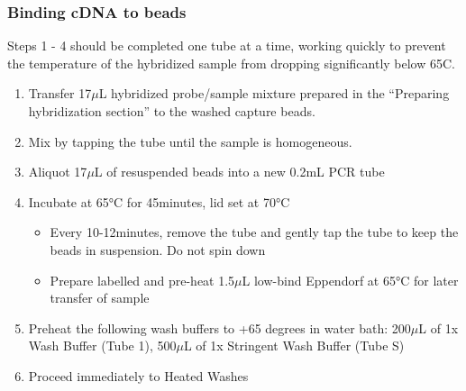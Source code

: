 \subsubsection{Binding cDNA to beads}
Steps 1 - 4 should be completed one tube at a time, working quickly to prevent the temperature of the hybridized sample from dropping significantly below 65C.
\begin{enumerate}
	\item Transfer 17$\mu$L hybridized probe/sample mixture prepared in the “Preparing hybridization section” to the washed capture beads.
	\item Mix by tapping the tube until the sample is homogeneous. 
	\item Aliquot 17$\mu$L of resuspended beads into a new 0.2mL PCR tube 
	\item Incubate at 65°C for 45minutes, lid set at 70°C
	\begin{itemize}
		\item Every 10-12minutes, remove the tube and gently tap the tube to keep the beads in suspension. Do not spin down 
		\item Prepare labelled and pre-heat 1.5$\mu$L low-bind Eppendorf at 65°C for later transfer of sample 
	\end{itemize} 
	\item Preheat the following wash buffers to +65 degrees in water bath: 200$\mu$L of 1x Wash Buffer (Tube 1), 500$\mu$L of 1x Stringent Wash Buffer (Tube S)
	\item Proceed immediately to Heated Washes
\end{enumerate} 

